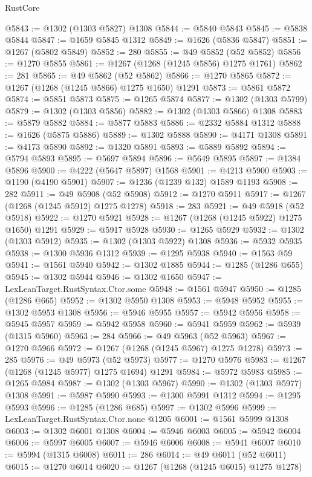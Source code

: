 \begin{lexlean}{RustCore}
\begin{coremodule}
@5843 := @1302 (@1303 @5827) @1308
@5844 := @5840 @5843
@5845 := @5838 @5844
@5847 := @1659 @5845 @1312
@5849 := @1626 (@5836 @5847)
@5851 := @1267 (@5802 @5849)
@5852 := 280
@5855 := @49 @5852 (@52 @5852)
@5856 := @1270 @5855
@5861 := @1267 (@1268 (@1245 @5856) @1275 @1761)
@5862 := 281
@5865 := @49 @5862 (@52 @5862)
@5866 := @1270 @5865
@5872 := @1267 (@1268 (@1245 @5866) @1275 @1650) @1291
@5873 := @5861 @5872
@5874 := @5851 @5873
@5875 := @1265 @5874
@5877 := @1302 (@1303 @5799)
@5879 := @1302 (@1303 @5856)
@5882 := @1302 (@1303 @5866) @1308
@5883 := @5879 @5882
@5884 := @5877 @5883
@5886 := @2332 @5884 @1312
@5888 := @1626 (@5875 @5886)
@5889 := @1302 @5888
@5890 := @4171 @1308
@5891 := @4173 @5890
@5892 := @1320 @5891
@5893 := @5889 @5892
@5894 := @5794 @5893
@5895 := @5697 @5894
@5896 := @5649 @5895
@5897 := @1384 @5896
@5900 := @4222 (@5647 @5897) @1568
@5901 := @4213 @5900
@5903 := @1190 (@4190 @5901)
@5907 := @1236 (@1239 @132) @1589 @1193
@5908 := 282
@5911 := @49 @5908 (@52 @5908)
@5912 := @1270 @5911
@5917 := @1267 (@1268 (@1245 @5912) @1275 @1278)
@5918 := 283
@5921 := @49 @5918 (@52 @5918)
@5922 := @1270 @5921
@5928 := @1267 (@1268 (@1245 @5922) @1275 @1650) @1291
@5929 := @5917 @5928
@5930 := @1265 @5929
@5932 := @1302 (@1303 @5912)
@5935 := @1302 (@1303 @5922) @1308
@5936 := @5932 @5935
@5938 := @1300 @5936 @1312
@5939 := @1295 @5938
@5940 := @1563 @59
@5941 := @1561 @5940
@5942 := @1302 @1885
@5944 := @1285 (@1286 @655)
@5945 := @1302 @5944
@5946 := @1302 @1650
@5947 := LexLeanTarget.RustSyntax.Ctor.some
@5948 := @1561 @5947
@5950 := @1285 (@1286 @665)
@5952 := @1302 @5950 @1308
@5953 := @5948 @5952
@5955 := @1302 @5953 @1308
@5956 := @5946 @5955
@5957 := @5942 @5956
@5958 := @5945 @5957
@5959 := @5942 @5958
@5960 := @5941 @5959
@5962 := @5939 (@1315 @5960)
@5963 := 284
@5966 := @49 @5963 (@52 @5963)
@5967 := @1270 @5966
@5972 := @1267 (@1268 (@1245 @5967) @1275 @1278)
@5973 := 285
@5976 := @49 @5973 (@52 @5973)
@5977 := @1270 @5976
@5983 := @1267 (@1268 (@1245 @5977) @1275 @1694) @1291
@5984 := @5972 @5983
@5985 := @1265 @5984
@5987 := @1302 (@1303 @5967)
@5990 := @1302 (@1303 @5977) @1308
@5991 := @5987 @5990
@5993 := @1300 @5991 @1312
@5994 := @1295 @5993
@5996 := @1285 (@1286 @685)
@5997 := @1302 @5996
@5999 := LexLeanTarget.RustSyntax.Ctor.none @1205
@6001 := @1561 @5999 @1308
@6003 := @1302 @6001 @1308
@6004 := @5946 @6003
@6005 := @5942 @6004
@6006 := @5997 @6005
@6007 := @5946 @6006
@6008 := @5941 @6007
@6010 := @5994 (@1315 @6008)
@6011 := 286
@6014 := @49 @6011 (@52 @6011)
@6015 := @1270 @6014
@6020 := @1267 (@1268 (@1245 @6015) @1275 @1278)

\end{coremodule}
\end{lexlean}
